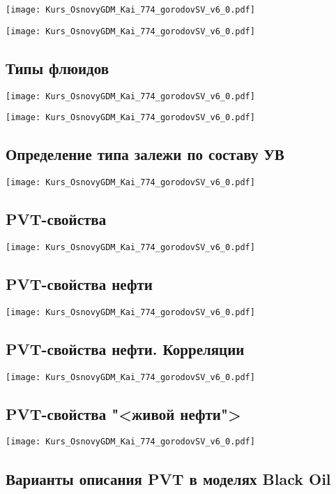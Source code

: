 \documentclass[main.tex]{subfiles}
\begin{document}
\texttt{[image: Kurs\_OsnovyGDM\_Kai\_774\_gorodovSV\_v6\_0.pdf]}

\texttt{[image: Kurs\_OsnovyGDM\_Kai\_774\_gorodovSV\_v6\_0.pdf]}

\subsection{Типы флюидов}

\texttt{[image: Kurs\_OsnovyGDM\_Kai\_774\_gorodovSV\_v6\_0.pdf]}

\texttt{[image: Kurs\_OsnovyGDM\_Kai\_774\_gorodovSV\_v6\_0.pdf]}

\subsection{Определение типа залежи по составу УВ}

\texttt{[image: Kurs\_OsnovyGDM\_Kai\_774\_gorodovSV\_v6\_0.pdf]}

\subsection{PVT-свойства}

\texttt{[image: Kurs\_OsnovyGDM\_Kai\_774\_gorodovSV\_v6\_0.pdf]}

\subsection{PVT-свойства нефти}

\texttt{[image: Kurs\_OsnovyGDM\_Kai\_774\_gorodovSV\_v6\_0.pdf]}

\subsection{PVT-свойства нефти. Корреляции}

\texttt{[image: Kurs\_OsnovyGDM\_Kai\_774\_gorodovSV\_v6\_0.pdf]}

\subsection{PVT-свойства "<живой нефти">}

\texttt{[image: Kurs\_OsnovyGDM\_Kai\_774\_gorodovSV\_v6\_0.pdf]}

\subsection{Варианты описания PVT в моделях Black Oil}
\end{document}
